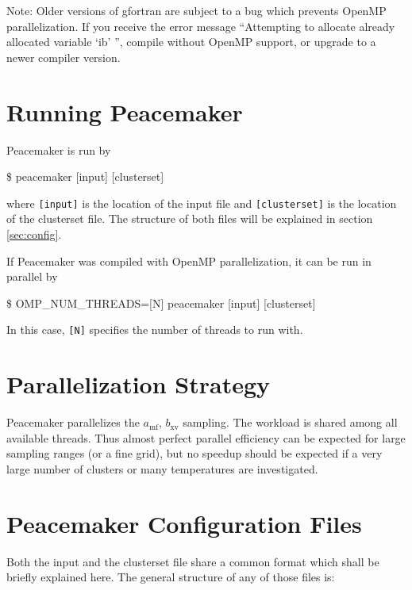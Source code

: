 \documentclass{scrartcl}
\newcommand{\amf}{a_\mathrm{mf}}
\newcommand{\bxv}{b_\mathrm{xv}}
\begin{document}
Note: Older versions of gfortran are subject to a bug which prevents OpenMP parallelization.
If you receive the error message ``Attempting to allocate already allocated variable `ib' '', compile without OpenMP support, or upgrade to a newer compiler version.

\section{Running Peacemaker}

Peacemaker is run by
\begin{addmargin}[1cm]{0cm}
    \ttfamily
    \$ peacemaker [input] [clusterset]
\end{addmargin}
where \texttt{[input]} is the location of the input file and \texttt{[clusterset]} is the location of the clusterset file.
The structure of both files will be explained in section \vref{sec:config}.

If Peacemaker was compiled with OpenMP parallelization, it can be run in parallel by
\begin{addmargin}[1cm]{0cm}
    \ttfamily
    \$ OMP\_NUM\_THREADS=[N] peacemaker [input] [clusterset]
\end{addmargin}
In this case, \texttt{[N]} specifies the number of threads to run with.

\section{Parallelization Strategy}

Peacemaker parallelizes the $\amf$, $\bxv$ sampling.
The workload is shared among all available threads.
Thus almost perfect parallel efficiency can be expected for large sampling ranges (or a fine grid), but no speedup should be expected
if a very large number of clusters or many temperatures are investigated.

\section{Peacemaker Configuration Files}
\label{sec:config}

Both the input and the clusterset file share a common format which shall be briefly explained here.
The general structure of any of those files is:
\end{document}
